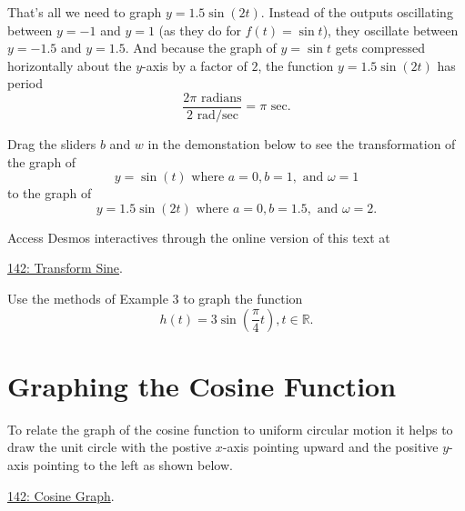 \documentclass{ximera}
\begin{document}
\begin{example}
That's all we need to graph $y=1.5 \sin (2t)$. Instead of the outputs oscillating between $y=-1$ and $y=1$ (as they do for $f(t)=\sin t$), they oscillate between $y=-1.5$ and $y=1.5$. And because the graph of $y=\sin t$ gets compressed horizontally about the $y$-axis by a factor of $2$, the function $y=1.5 \sin (2t)$ has period 
\[
  \frac{2 \pi \text{ radians}}{2 \text{ rad/sec}} = \pi \text{ sec}.
\]

 Drag the sliders $b$ and $w$ in the demonstation below to see the transformation of the graph of
\[
  y = \sin (t) \text{ where } a=0, b=1, \text{ and }\omega = 1
\] 
to the graph of 
\[
  y = 1.5 \sin (2t) \text{ where } a=0, b=1.5, \text{ and }\omega = 2 .
\] 

Access Desmos interactives through the online version of this text at
 
\href{https://www.desmos.com/calculator/qrkgbi3gtr}{142: Transform Sine}.

 
\begin{onlineOnly}
    \begin{center}
\end{center}
\end{onlineOnly}
\end{example}

\begin{question}\label{Qdgt4jh65}
Use the methods of Example 3 to graph the function
\[
   h(t) = 3\sin\left( \frac{\pi}{4}t \right) , t\in \mathbb{R}.
\]
\end{question}


\section{Graphing the Cosine Function}

\begin{example}  \label{ExPDlreDFer}
To relate the graph of the cosine function to uniform circular motion it helps to draw the unit circle with the postive $x$-axis pointing upward and the positive $y$-axis pointing to the left as shown below.

\href{https://www.desmos.com/calculator/xdfdimlpij}{142: Cosine Graph}.

 
\begin{onlineOnly}
    \begin{center}
\end{center}
\end{onlineOnly}
\end{example}
\end{document}
